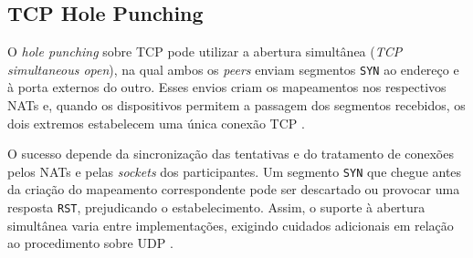 \subsection{TCP Hole Punching}
\label{sec:tcp_hole_punching}

O \textit{hole punching} sobre TCP pode utilizar a abertura simultânea (\textit{TCP simultaneous open}), na qual ambos os \textit{peers} enviam segmentos \texttt{SYN} ao endereço e à porta externos do outro. Esses envios criam os mapeamentos nos respectivos NATs e, quando os dispositivos permitem a passagem dos segmentos recebidos, os dois extremos estabelecem uma única conexão TCP \citep{ford2005peer, rfc5128}.

O sucesso depende da sincronização das tentativas e do tratamento de conexões pelos NATs e pelas \textit{sockets} dos participantes. Um segmento \texttt{SYN} que chegue antes da criação do mapeamento correspondente pode ser descartado ou provocar uma resposta \texttt{RST}, prejudicando o estabelecimento. Assim, o suporte à abertura simultânea varia entre implementações, exigindo cuidados adicionais em relação ao procedimento sobre UDP \citep{ford2005peer, rfc5128}.

